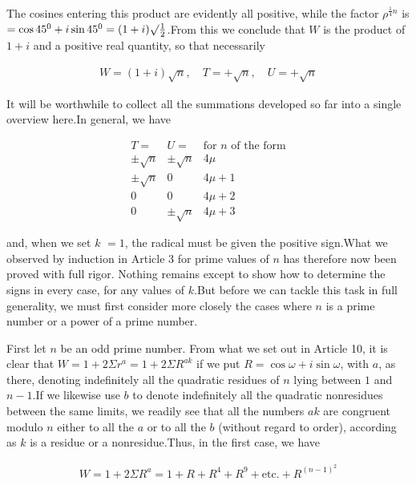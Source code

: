 The cosines entering this product are evidently all positive, while the factor $\rho^{\frac14n}$ is $=\cos45^0+i\sin45^0=(1+i)\surd\frac12$.\quad From this we conclude that $W$ is the product of $1+i$ and a positive real quantity, so that necessarily

\[
\begin{aligned}
W=(1+i)\surd n,\quad T=+\surd n,\quad U=+\surd n
\end{aligned}
\]


It will be worthwhile to collect all the summations developed so far into a single overview here.\quad In general, we have

\[
\begin{array}{c|c|c}
T=&U=&\text{for }n\text{ of the form}\\\hline
\pm\surd n&\pm\surd n&4\mu\\
\pm\surd n&0&4\mu+1\\
0&0&4\mu+2\\
0&\pm\surd n&4\mu+3
\end{array}
\]

and, when we set $k$ $=1$, the radical must be given the positive sign.\quad What we observed by induction in Article 3 for prime values of $n$ has therefore now been proved with full rigor. Nothing remains except to show how to determine the signs in every case, for any values of $k$.\quad But before we can tackle this task in full generality, we must first consider more closely the cases where $n$ is a prime number or a power of a prime number.


First let $n$ be an odd prime number. From what we set out in Article 10, it is clear that $W=1+2\Sigma r^a=1+2\Sigma R^{ak}$ if we put $R=\cos\omega+i\sin\omega$, with $a$, as there, denoting indefinitely all the quadratic residues of $n$ lying between $1$ and $n-1$.\quad If we likewise use $b$ to denote indefinitely all the quadratic nonresidues between the same limits, we readily see that all the numbers $ak$ are congruent modulo $n$ either to all the $a$ or to all the $b$ (without regard to order), according as $k$ is a residue or a nonresidue.\quad Thus, in the first case, we have


\[
\begin{aligned}
W=1+2\Sigma R^a=1+R+R^4+R^9+\text{etc.}+R^{(n-1)^2}
\end{aligned}
\]

